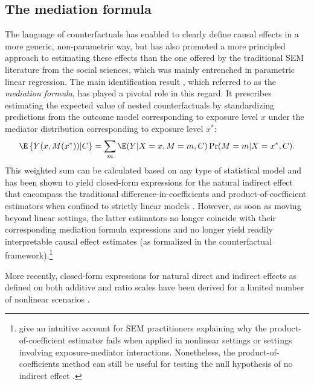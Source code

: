 \documentclass[nojss]{jss}
\begin{document}
\subsection{The mediation formula}\label{medform}
The language of counterfactuals has enabled to clearly define causal effects in a more generic, non-parametric way, but has also promoted a more principled approach to estimating these effects than the one offered by the traditional SEM literature from the social sciences, which was mainly entrenched in parametric linear regression.
The main identification result \citep{Pearl2001,Imai2010a}, which \cite{Pearl2012} referred to as the \textit{mediation formula}, has played a pivotal role in this regard. It prescribes estimating the expected value of nested counterfactuals by standardizing predictions from the outcome model corresponding to exposure level $x$ under the mediator distribution corresponding to exposure level $x^*$: $$\E\left\{Y(x,M(x^*))|C\right\} = \sum_m \E(Y|X=x,M=m,C) \Pr(M=m|X=x^*,C).$$  This weighted sum can be calculated based on any type of statistical model and has been shown to yield closed-form expressions for the natural indirect effect that encompass the traditional difference-in-coefficients and product-of-coefficient estimators when confined to strictly linear models \citep[e.g.,][]{VanderWeele2009b, Pearl2012}. However, as soon as moving beyond linear settings, the latter estimators no longer coincide with their corresponding mediation formula expressions and no longer yield readily interpretable causal effect estimates (as formalized in the counterfactual framework).\footnote{\cite{Muthen2014} give an intuitive account for SEM practitioners explaining why the product-of-coefficient estimator fails when applied in nonlinear settings or settings involving exposure-mediator interactions. Nonetheless, the product-of-coefficients method can still be useful for testing the null hypothesis of no indirect effect \citep{VanderWeele2011a,Vansteelandt2012}.}
\par More recently, closed-form expressions for natural direct and indirect effects as defined on both additive and ratio scales have been derived for a limited number of nonlinear scenarios \citep{VanderWeele2009b,VanderWeele2010,Valeri2013}.

\newpage
\end{document}
